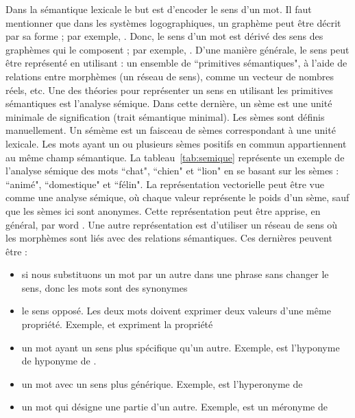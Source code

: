 \documentclass{KodeBook}
\begin{document}
Dans la sémantique lexicale le but est d'encoder le sens d'un mot. 
Il faut mentionner que dans les systèmes logographiques, un graphème peut être décrit par sa forme ; par exemple, .
Donc, le sens d'un mot est dérivé des sens des graphèmes qui le composent ; par exemple, .
D'une manière générale, le sens peut être représenté en utilisant : un ensemble de ``primitives sémantiques", à l'aide de relations entre morphèmes (un réseau de sens), comme un vecteur de nombres réels, etc.
Une des théories pour représenter un sens en utilisant les primitives sémantiques est l'analyse sémique. 
Dans cette dernière, un sème est une unité minimale de signification (trait sémantique minimal). 
Les sèmes sont définis manuellement. 
Un sémème est un faisceau de sèmes correspondant à une unité lexicale. 
Les mots ayant un ou plusieurs sèmes positifs en commun appartiennent au même champ sémantique.  
La tableau~\ref{tab:semique} représente un exemple de l'analyse sémique des mots ``chat", ``chien" et ``lion" en se basant sur les sèmes : ``animé", ``domestique" et ``félin". 
La représentation vectorielle peut être vue comme une analyse sémique, où chaque valeur représente le poids d'un sème, sauf que les sèmes ici sont anonymes. 
Cette représentation peut être apprise, en général, par word . 
Une autre représentation est d'utiliser un réseau de sens où les morphèmes sont liés avec des relations sémantiques.
Ces dernières peuvent être : 
\begin{itemize}
	\item {} si nous substituons un mot par un autre dans une phrase sans changer le sens, donc les mots sont des synonymes
	\item {} le sens opposé. Les deux mots doivent exprimer deux valeurs d'une même propriété. Exemple,  et  expriment la propriété 
	\item {} un mot ayant un sens plus spécifique qu'un autre. Exemple,  est l'hyponyme de  hyponyme de . 
	\item {} un mot avec un sens plus générique. Exemple,  est l'hyperonyme de 
	\item {} un mot qui désigne une partie d'un autre. Exemple,  est un méronyme de 
\end{itemize}
\end{document}
